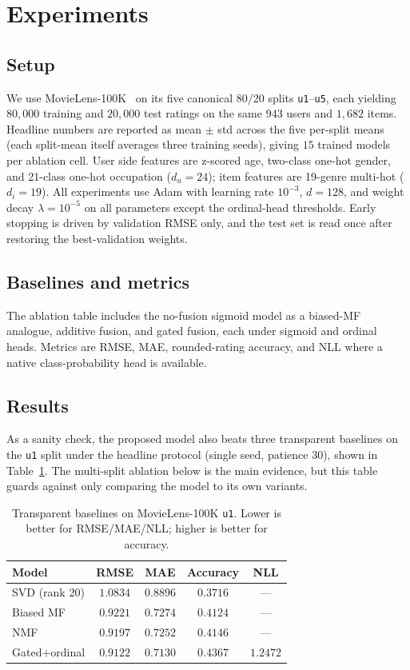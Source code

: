 \documentclass{article} %
\begin{document}
\section{Experiments}
\label{sec:exp}

\subsection{Setup}
We use MovieLens-100K~\cite{harper2015movielens} on its five canonical
$80/20$ splits \texttt{u1}--\texttt{u5}, each yielding $80{,}000$ training and
$20{,}000$ test ratings on the same $943$ users and $1{,}682$ items.
Headline numbers are reported as mean $\pm$ std across the five per-split
means (each split-mean itself averages three training seeds), giving
$15$ trained models per ablation cell. User side features are z-scored age,
two-class one-hot gender, and 21-class one-hot occupation ($d_u=24$); item
features are 19-genre multi-hot ($d_i=19$). All experiments use Adam with
learning rate $10^{-3}$, $d=128$, and weight decay $\lambda=10^{-5}$ on all
parameters except the ordinal-head thresholds. Early stopping is driven by
validation RMSE only, and the test set is read once after restoring the
best-validation weights.

\subsection{Baselines and metrics}
The ablation table includes the no-fusion sigmoid model as a biased-MF
analogue, additive fusion, and gated fusion, each under sigmoid and ordinal
heads. Metrics are RMSE, MAE, rounded-rating accuracy, and NLL where a native
class-probability head is available.

\subsection{Results}
As a sanity check, the proposed model also beats three transparent baselines
on the \texttt{u1} split under the headline protocol (single seed, patience
30), shown in Table~\ref{tab:baselines}. The multi-split ablation below is the
main evidence, but this table guards against only comparing the model to its
own variants.

\begin{table}[ht]
\centering
\caption{Transparent baselines on MovieLens-100K \texttt{u1}. Lower is better
for RMSE/MAE/NLL; higher is better for accuracy.}
\label{tab:baselines}
\begin{tabular}{lcccc}
\toprule
Model & RMSE & MAE & Accuracy & NLL \\
\midrule
SVD (rank 20) & $1.0834$ & $0.8896$ & $0.3716$ & --- \\
Biased MF & $0.9221$ & $0.7274$ & $0.4124$ & --- \\
NMF & $0.9197$ & $0.7252$ & $0.4146$ & --- \\
Gated$+$ordinal & $\mathbf{0.9122}$ & $\mathbf{0.7130}$ & $\mathbf{0.4367}$ & $\mathbf{1.2472}$ \\
\bottomrule
\end{tabular}
\end{table}
\end{document}
